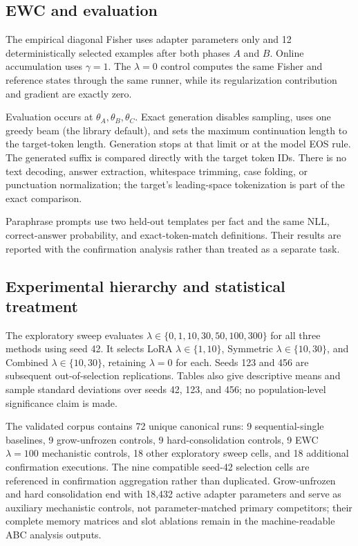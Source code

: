 \documentclass[12pt,a4paper]{article}
\begin{document}
\subsection{EWC and evaluation}
The empirical diagonal Fisher uses adapter parameters only and 12 deterministically selected examples after both phases \(A\) and \(B\). Online accumulation uses \(\gamma=1\). The \(\lambda=0\) control computes the same Fisher and reference states through the same runner, while its regularization contribution and gradient are exactly zero.

Evaluation occurs at \(\theta_A,\theta_B,\theta_C\). Exact generation disables sampling, uses one greedy beam (the library default), and sets the maximum continuation length to the target-token length. Generation stops at that limit or at the model EOS rule. The generated suffix is compared directly with the target token IDs. There is no text decoding, answer extraction, whitespace trimming, case folding, or punctuation normalization; the target's leading-space tokenization is part of the exact comparison.

Paraphrase prompts use two held-out templates per fact and the same NLL, correct-answer probability, and exact-token-match definitions. Their results are reported with the confirmation analysis rather than treated as a separate task.

\subsection{Experimental hierarchy and statistical treatment}
The exploratory sweep evaluates \(\lambda\in\{0,1,10,30,50,100,300\}\) for all three methods using seed 42. It selects LoRA \(\lambda\in\{1,10\}\), Symmetric \(\lambda\in\{10,30\}\), and Combined \(\lambda\in\{10,30\}\), retaining \(\lambda=0\) for each. Seeds 123 and 456 are subsequent out-of-selection replications. Tables also give descriptive means and sample standard deviations over seeds 42, 123, and 456; no population-level significance claim is made.

The validated corpus contains 72 unique canonical runs: 9 sequential-single baselines, 9 grow-unfrozen controls, 9 hard-consolidation controls, 9 EWC \(\lambda=100\) mechanistic controls, 18 other exploratory sweep cells, and 18 additional confirmation executions. The nine compatible seed-42 selection cells are referenced in confirmation aggregation rather than duplicated. Grow-unfrozen and hard consolidation end with 18,432 active adapter parameters and serve as auxiliary mechanistic controls, not parameter-matched primary competitors; their complete memory matrices and slot ablations remain in the machine-readable ABC analysis outputs.
\end{document}
